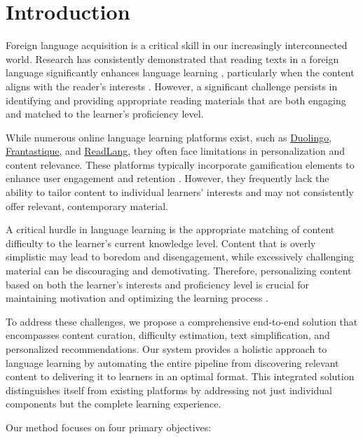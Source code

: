 \section{Introduction}

Foreign language acquisition is a critical skill in our increasingly interconnected world. Research has consistently demonstrated that reading texts in a foreign language significantly enhances language learning \cite{reading_wright_2006, Frances2020The}, particularly when the content aligns with the reader's interests \cite{interestbased_asgari_2019, Schiefele1999Interest,Chodkiewicz2016On}. However, a significant challenge persists in identifying and providing appropriate reading materials that are both engaging and matched to the learner's proficiency level.

While numerous online language learning platforms exist, such as \href{https://www.duolingo.com/}{\underline{Duolingo}}, \href{https://www.frantastique.com/}{\underline{Frantastique}}, and \href{https://readlang.com/}{\underline{ReadLang}}, they often face limitations in personalization and content relevance. These platforms typically incorporate gamification elements to enhance user engagement and retention \cite{tuncay2020app}. However, they frequently lack the ability to tailor content to individual learners' interests and may not consistently offer relevant, contemporary material.

A critical hurdle in language learning is the appropriate matching of content difficulty to the learner's current knowledge level. Content that is overly simplistic may lead to boredom and disengagement, while excessively challenging material can be discouraging and demotivating. Therefore, personalizing content based on both the learner's interests and proficiency level is crucial for maintaining motivation and optimizing the learning process \cite{2006Penetrating}.

To address these challenges, we propose a comprehensive end-to-end solution that encompasses content curation, difficulty estimation, text simplification, and personalized recommendations. Our system provides a holistic approach to language learning by automating the entire pipeline from discovering relevant content to delivering it to learners in an optimal format. This integrated solution distinguishes itself from existing platforms by addressing not just individual components but the complete learning experience.

Our method focuses on four primary objectives:


